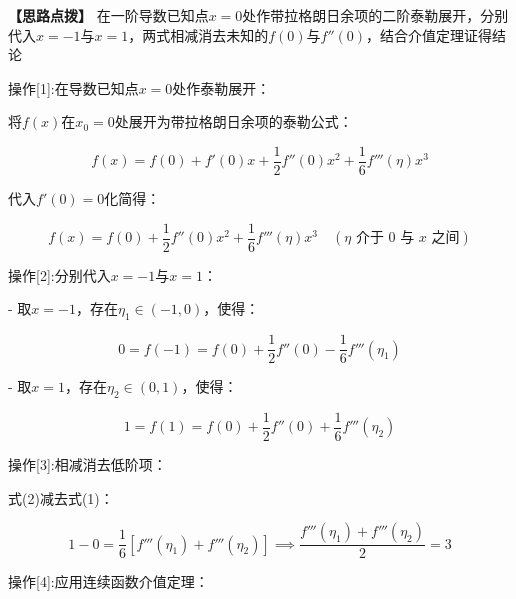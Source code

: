 \documentclass[11pt,a4paper,UTF8]{ctexart}
\begin{document}
\textbf{\color{DeepPurple}【思路点拨】} 在一阶导数已知点$x=0$处作带拉格朗日余项的二阶泰勒展开，分别代入$x = -1$与$x = 1$，两式相减消去未知的$f(0)$与$f''(0)$，结合介值定理证得结论


操作[1]:在导数已知点$x = 0$处作泰勒展开：

\begin{solbox}[分步推导与答题规范]
将$f(x)$在$x_0 = 0$处展开为带拉格朗日余项的泰勒公式：


\begin{equation*}
f(x) = f(0) + f'(0)x + \frac{1}{2}f''(0)x^2 + \frac{1}{6}f'''(\eta)x^3
\end{equation*}


代入$f'(0) = 0$化简得：


\begin{equation*}
f(x) = f(0) + \frac{1}{2}f''(0)x^2 + \frac{1}{6}f'''(\eta)x^3 \quad (\eta \text{ 介于 } 0 \text{ 与 } x \text{ 之间})
\end{equation*}

\end{solbox}

操作[2]:分别代入$x = -1$与$x = 1$：

\begin{solbox}[分步推导与答题规范]
- 取$x = -1$，存在$\eta_1 \in (-1, 0)$，使得：

 
\begin{equation*}
0 = f(-1) = f(0) + \frac{1}{2}f''(0) - \frac{1}{6}f'''(\eta_1) \tag{1}
\end{equation*}


- 取$x = 1$，存在$\eta_2 \in (0, 1)$，使得：

 
\begin{equation*}
1 = f(1) = f(0) + \frac{1}{2}f''(0) + \frac{1}{6}f'''(\eta_2) \tag{2}
\end{equation*}

\end{solbox}

操作[3]:相减消去低阶项：

\begin{solbox}[分步推导与答题规范]
式(2)减去式(1)：


\begin{equation*}
1 - 0 = \frac{1}{6}\left[f'''(\eta_1) + f'''(\eta_2)\right] \implies \frac{f'''(\eta_1) + f'''(\eta_2)}{2} = 3
\end{equation*}

\end{solbox}

操作[4]:应用连续函数介值定理：
\end{document}
